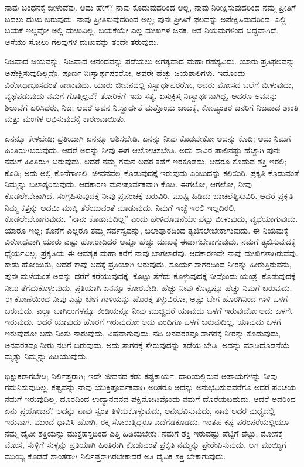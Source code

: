 ನಾವು ಬಂಧನಕ್ಕೆ ಬೀಳುವೆವು. ಅದು ಹೇಗೆ? ನಾವು ಕೊಡುವುದರಿಂದ ಅಲ್ಲ, ನಾವು ನಿರೀಕ್ಷಿಸುವುದರಿಂದ ನಮ್ಮ ಪ್ರೀತಿಗೆ ಬದಲು ದುಃಖ ಬರುವುದು. ನಾವು ಪ್ರೀತಿಸುವುದರಿಂದ ಅಲ್ಲ; ಪುನಃ ಪ್ರೀತಿಗೆ ಫಲವನ್ನು ಅಪೇಕ್ಷಿಸಿದುದರಿಂದ. ಎಲ್ಲಿ ಬಯಕೆ ಇಲ್ಲವೋ ಅಲ್ಲಿ ದುಃಖವಿಲ್ಲ. ಬಯಕೆಯೇ ಎಲ್ಲ ದುಃಖಗಳ ಜನಕ. ಆಸೆ ನಿಯಮಗಳಿಂದ ಬದ್ದವಾಗಿದೆ. ಆಸೆಯು ಸೋಲು ಗೆಲವುಗಳ ದುಃಖವನ್ನು ತಂದೇ ತರುವುದು.

ನಿಜವಾದ ಜಯವನ್ನು, ನಿಜವಾದ ಆನಂದವನ್ನು ಪಡೆಯಲು ಅಗತ್ಯವಾದ ಮಹಾ ರಹಸ್ಯವಿದು. ಯಾರು ಪ್ರತಿಫಲವನ್ನು ಅಪೇಕ್ಷಿಸುವುದಿಲ್ಲವೊ, ಪೂರ್ಣ ನಿಃಸ್ವಾರ್ಥಪರರೋ, ಅವರೇ ಹೆಚ್ಚು ಜಯಶಾಲಿಗಳು. ಇದೊಂದು ವಿರೋಧಾಭಾಸದಂತೆ ಕಾಣುವುದು. ಯಾರು ಜೀವನದಲ್ಲಿ ನಿಸ್ವಾರ್ಥಪರರೋ, ಅವರು ಮೋಸದ ಬಲೆಗೆ ಬೀಳುವುದು, ವ್ಯಥೆಪಡುವುದು ನಮಗೆ ಗೊತ್ತಿಲ್ಲವೆ? ತೋರಿಕೆಗೆ ಇದು ಸತ್ಯ. ಏಸುಕ್ರಿಸ್ತ ನಿಃಸ್ವಾರ್ಥನಾಗಿದ್ದ, ಆದರೂ ಅವನನ್ನು ಶಿಲುಬೆಗೆ ಏರಿಸಿದರು, ನಿಜ; ಆದರೆ ಅವನ ನಿಃಸ್ವಾರ್ಥತೆ ಮತ್ತೊಂದು ಜಯಕ್ಕೆ, ಕೋಟ್ಯಂತರ ಜನರಿಗೆ ನಿಜವಾದ ಶಾಂತಿ ಮತ್ತು ಮಂಗಳ ಲಭಿಸುವುದಕ್ಕೆ ಕಾರಣವಾಯಿತು.

ಏನನ್ನೂ ಕೇಳಬೇಡಿ; ಪ್ರತಿಯಾಗಿ ಏನನ್ನೂ ಆಶಿಸಬೇಡಿ. ಏನನ್ನು ನೀವು ಕೊಡಬೇಕೋ ಅದನ್ನು ಕೊಡಿ; ಅದು ನಿಮಗೆ ಹಿಂತಿರುಗಿಬರುವುದು. ಆದರೆ ಅದನ್ನು ನೀವು ಈಗ ಆಲೋಚಿಸಬೇಡಿ. ಅದು ಸಾವಿರ ಪಾಲಿನಷ್ಟು ಹೆಚ್ಚಾಗಿ ಪುನಃ ನಮಗೆ ಹಿಂತಿರುಗಿ ಬರುವುದು. ಆದರೆ ನಮ್ಮ ಗಮನ ಅದರ ಕಡೆಗೆ ಇರಕೂಡದು. ಆದರೂ ಕೊಡುವ ಶಕ್ತಿ ಇರಲಿ; ಕೊಡಿ; ಅದು ಅಲ್ಲಿ ಕೊನೆಗಾಣಲಿ. ಜೀವನವೆಲ್ಲ ಕೊಡುವುದಕ್ಕೆ ಇರುವುದು ಎಂಬುದನ್ನು ಕಲಿಯಿರಿ. ಪ್ರಕೃತಿ ಕೊಡುವಂತೆ ನಿಮ್ಮನ್ನು ಬಲಾತ್ಕರಿಸುವುದು. ಆದಕಾರಣ ಮನಃಪೂರ್ವಕವಾಗಿ ಕೊಡಿ. ಈಗಲೋ, ಆಗಲೋ, ನೀವು ಕೊಡಲೇಬೇಕಾಗಿದೆ. ಸಂಗ್ರಹಿಸುವುದಕ್ಕೆ ನೀವು ಪ್ರಪಂಚಕ್ಕೆ ಬರುವಿರಿ. ಮುಷ್ಟಿ ಹಿಡಿದು ಬಾಚಲೆತ್ನಿಸುವಿರಿ. ಆದರೆ ಪ್ರಕೃತಿ ನಿಮ್ಮ ಕತ್ತನ್ನು ಅದಮಿ ಮುಷ್ಠಿ ತೆರೆಯುವಂತೆ ಮಾಡುವುದು. ನಿಮಗೆ ಇಚ್ಛೆ ಇರಲಿ ಇಲ್ಲದಿರಲಿ, ಕೊಡಲೇಬೇಕಾಗುವುದು. "ನಾನು ಕೊಡುವುದಿಲ್ಲ” ಎಂದು ಹೇಳಿದೊಡನೆಯೇ ಪೆಟ್ಟು ಬೀಳುವುದು, ವ್ಯಥೆಯಾಗುವುದು. ಯಾರೂ ಇಲ್ಲ; ಕೊನೆಗೆ ಎಲ್ಲರೂ ತಮ್ಮ ಸರ್ವಸ್ವವನ್ನು, ಬಲಾತ್ಕಾರದಿಂದ ತ್ಯಜಿಸಲೇಬೇಕಾಗುವುದು. ಈ ನಿಯಮಕ್ಕೆ ವಿರೋಧವಾಗಿ ಯಾರು ಎಷ್ಟು ಹೋರಾಡಿದರೆ ಅಷ್ಟೂ ಹೆಚ್ಚು ದುಃಖಕ್ಕೆ ಈಡಾಗಬೇಕಾಗುವುದು. ನಮಗೆ ತ್ಯಜಿಸುವುದಕ್ಕೆ ಧೈರ್ಯವಿಲ್ಲ. ಪ್ರಕೃತಿಯ ಈ ಆವಶ್ಯಕ ಮಹಾ ಕರೆಗೆ ನಾವು ಬಾಗಲಾರೆವು. ಆದಕಾರಣವೇ ನಾವು ದುಃಖಿಗಳಾಗಿರುವೆವು. ಕಾಡು ಹೋಯಿತು, ಆದರೆ ಕಾವು ಅದಕ್ಕೆ ಪ್ರತಿಯಾಗಿ ಬರುವುದು. ಸೂರ್ಯ ಸಾಗರದಿಂದ ನೀರನ್ನು ಹೀರುತ್ತಿರುವನು, ಪುನಃ ಮಳೆಯಂತೆ ಅದನ್ನು ಧರೆಗೆ ಕರೆಯುವುದಕ್ಕೆ. ಕೊಟ್ಟು ತೆಗೆದು ಕೊಳ್ಳುವುದಕ್ಕೆ ನೀವೊಂದು ಯಂತ್ರ. ಕೊಡುವುದಕ್ಕೆ ನೀವು ತೆಗೆದುಕೊಳ್ಳುವುದು. ಪ್ರತಿಯಾಗಿ ಏನನ್ನೂ ಕೋರಬೇಡಿ. ಹೆಚ್ಚು ನೀವು ಕೊಟ್ಟಷ್ಟೂ ಹೆಚ್ಚು ನಿಮಗೆ ಬರುವುದು. ಈ ಕೋಣೆಯಿಂದ ನೀವು ಎಷ್ಟು ಬೇಗ ಗಾಳಿಯನ್ನು ಹೊರಕ್ಕೆ ತಳ್ಳುವಿರೋ, ಅಷ್ಟು ಬೇಗ ಹೊರಗಿನಿಂದ ಗಾಳಿ ಒಳಗೆ ಬರುವುದು. ಎಲ್ಲಾ ಬಾಗಿಲುಗಳನ್ನೂ ಕಂಡಿಯನ್ನೂ ನೀವು ಮುಚ್ಚಿದರೆ ಯಾವುದು ಒಳಗೆ ಇರುವುದೋ ಅದು ಒಳಗೇ ಇರುವುದು. ಆದರೆ ಯಾವುದು ಹೊರಗೆ ಇರುವುದೋ ಅದು ಎಂದಿಗೂ ಒಳಗೆ ಬರುವುದಿಲ್ಲ. ಯಾವುದು ಒಳಗೆ ಇರುವುದೋ ಅದು ನಿಂತು ನಾರುವುದು, ವಿಷವಾಗುವುದು. ನದಿ ಅನವರತವೂ ಸಾಗರಕ್ಕೆ ನೀರನ್ನು ಕೊಡುವುದು, ಅನವರತವೂ ನೀರು ನದಿಗೆ ಬರುವುದು. ಅದು ಸಾಗರಕ್ಕೆ ಸೇರುವುದನ್ನು ತಡೆಯ ಬೇಡಿ. ಅದನ್ನು ಮಾಡಿದೊಡನೆಯೆ ಮೃತ್ಯು ನಿಮ್ಮನ್ನು ಹಿಡಿಯುವುದು.

ಭಿಕ್ಷುಕರಾಗಬೇಡಿ; ನಿರ್ಲಿಪ್ತರಾಗಿ; ಇದೇ ಜೀವನದ ಕಡು ಕಷ್ಟಕಾರ್ಯ. ದಾರಿಯಲ್ಲಿರುವ ಅಪಾಯಗಳನ್ನು ನೀವು ಗಮನಿಸುವುದಿಲ್ಲ. ಕಷ್ಟವನ್ನು ನಾವು ಯುಕ್ತಿಪೂರ್ವಕವಾಗಿ ಅರಿತರೂ ಅದನ್ನು ಅನುಭವಿಸುವವರೆಗೂ ಅದರ ಪರಿಚಯ ನಮಗೆ ಇರುವುದಿಲ್ಲ. ದೂರದಿಂದ ಉದ್ಯಾನವನದ ಪಕ್ಷಿನೋಟವೊಂದು ನಮಗೆ ದೊರೆಯಬಹುದು. ಆದರೆ ಅದರಿಂದ ಏನು ಪ್ರಯೋಜನ? ಅದನ್ನು ನಾವು ಸ್ವಂತ ತಿಳಿದುಕೊಳ್ಳುವುದು, ಅನುಭವಿಸುವುದು, ನಾವು ಅದರ ಮಧ್ಯದಲ್ಲಿ ಇರುವಾಗ. ಮುಂದೆ ಧಾವಿಸಿ ಹೋಗಿ, ರಕ್ತ ಸೋರುತ್ತಿದ್ದರೂ ಎದೆಗೆಡಕೂಡದು. ಇಂತಹ ಕಷ್ಟ ಪರಂಪರೆಯಲ್ಲಿಯೂ ನಮ್ಮ ದೈವೀ ಶಕ್ತಿಯನ್ನು ಮುಕ್ತಹಸ್ತದಿಂದ ಎತ್ತಿ ಹಿಡಿಯಬೇಕು. ನಮಗೆ ಶಕ್ತಿ ಇರುವಷ್ಟು ಪೆಟ್ಟಿಗೆ ಪೆಟ್ಟು, ಮೋಸಕ್ಕೆ ಮೋಸ, ಸುಳ್ಳಿಗೆ ಸುಳ್ಳನ್ನು ಪ್ರತಿಯಾಗಿ ಹಿಂತಿರುಗಿ ಕೊಡುವಂತೆ ಪ್ರಕೃತಿ ನಮ್ಮನ್ನು ಪ್ರೇರೇಪಿಸುವುದು. ಆಗ ಮುಯ್ಯಿಗೆ ಮುಯ್ಯಿ ಕೊಡದೆ ಶಾಂತರಾಗಿ ನಿರ್ಲಿಪ್ತರಾಗಿರಬೇಕಾದರೆ ಅತಿ ದೈವಿಕ ಶಕ್ತಿ ಬೇಕಾಗುವುದು.

